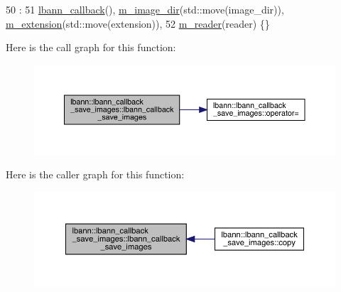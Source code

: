 \begin{DoxyCode}
50                                                         :
51     \hyperlink{classlbann_1_1lbann__callback_a679057298a41ddd47f08c157f756c584}{lbann\_callback}(), \hyperlink{classlbann_1_1lbann__callback__save__images_aeb69e2814c78d33a93b9ddc276c4cc57}{m\_image\_dir}(std::move(image\_dir)), 
      \hyperlink{classlbann_1_1lbann__callback__save__images_a7b37fa08f49051897ef427b8c810ca3a}{m\_extension}(std::move(extension)),
52     \hyperlink{classlbann_1_1lbann__callback__save__images_a275e409b2b2f3ebe2baeea636e18c607}{m\_reader}(reader) \{\}
\end{DoxyCode}
Here is the call graph for this function\+:\nopagebreak
\begin{figure}[H]
\begin{center}
\leavevmode
\includegraphics[width=350pt]{classlbann_1_1lbann__callback__save__images_a19825aa8f1bc28114a5269bee6c88758_cgraph}
\end{center}
\end{figure}
Here is the caller graph for this function\+:\nopagebreak
\begin{figure}[H]
\begin{center}
\leavevmode
\includegraphics[width=350pt]{classlbann_1_1lbann__callback__save__images_a19825aa8f1bc28114a5269bee6c88758_icgraph}
\end{center}
\end{figure}
\mbox{\label{classlbann_1_1lbann__callback__save__images_a3a01aa79c40d7d6f9120211d45141d23}} 
